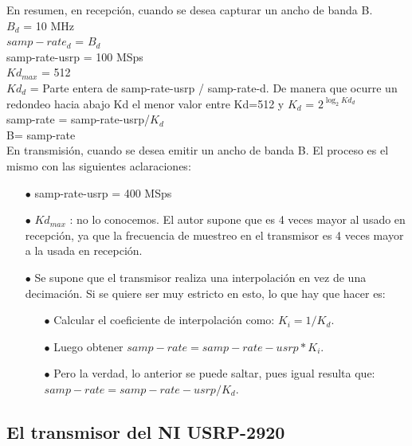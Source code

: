 En resumen, en recepción, cuando se desea capturar un ancho de banda B. \\

{\setlength{\parindent}{1pt}$B_{d}$ = 10 MHz \\}
\vspace{5px}
$samp-rate_{d}$ = $B_{d}$ \\
\vspace{5px}
samp-rate-usrp = 100 MSps \\
\vspace{5px}
$Kd_{max}$ = 512 \\
\vspace{5px}
$Kd_{d}$ = Parte entera de samp-rate-usrp / samp-rate-d. De manera que ocurre un redondeo hacia abajo Kd el menor valor entre Kd=512  y  $K_{d}$ = $2^{\log_{2}Kd_{d}} $ \\
\vspace{5px}
samp-rate = samp-rate-usrp/$K_{d}$ \\
\vspace{5px}
B= samp-rate \\

En transmisión, cuando se desea emitir un ancho de banda B. El proceso es el mismo con las siguientes aclaraciones:

\begin{itemize}
	\item [$\bullet$] samp-rate-usrp = 400 MSps
	\item [$\bullet$] $Kd_{max}$ : no lo conocemos. El autor supone que es 4 veces mayor al usado en recepción, ya que la frecuencia de muestreo en el transmisor es 4 veces mayor a la usada en recepción.
	\item [$\bullet$] Se supone que el transmisor realiza una interpolación en vez de una decimación. Si se quiere ser muy estricto en esto, lo que hay que hacer es:
	\begin{itemize}
		\item [$\bullet$] Calcular el coeficiente de interpolación como: $K_{i}=1/K_{d}$.
		\item [$\bullet$] Luego obtener $samp-rate = samp-rate-usrp*K_{i}$.
		\item [$\bullet$] Pero la verdad, lo anterior se puede saltar, pues igual resulta que: $samp-rate = samp-rate-usrp/K_{d}$.
		
	\end{itemize}
\end{itemize}

\subsection{El transmisor del NI USRP-2920}

